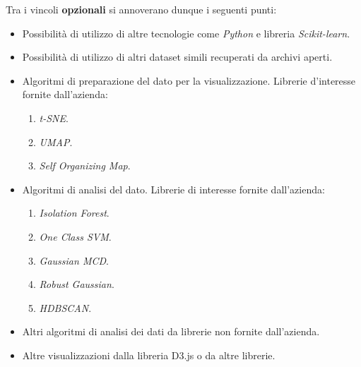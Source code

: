 \noindent Tra i vincoli \textbf{opzionali} si annoverano dunque i seguenti punti:
\begin{itemize}
\item Possibilità di utilizzo di altre tecnologie come \textit{Python} e libreria \textit{Scikit-learn}. 
\item Possibilità di utilizzo di altri dataset simili recuperati da archivi aperti.
\item Algoritmi di preparazione del dato per la visualizzazione. Librerie d'interesse fornite dall'azienda:
	\begin{enumerate}
                    \item \textit{t-SNE}.
                    \item \textit{UMAP}.
                    \item \textit{Self Organizing Map}.
	\end{enumerate}
\item Algoritmi di analisi del dato. Librerie di interesse fornite dall'azienda:
	\begin{enumerate}
                    \item \textit{Isolation Forest}.
                    \item \textit{One Class SVM}.
                    \item \textit{Gaussian MCD}.
                    \item \textit{Robust Gaussian}.
                    \item \textit{HDBSCAN}.
	\end{enumerate}
\item Altri algoritmi di analisi dei dati da librerie non fornite dall’azienda.
\item Altre visualizzazioni dalla libreria D3.js o da altre librerie.
\end{itemize}




